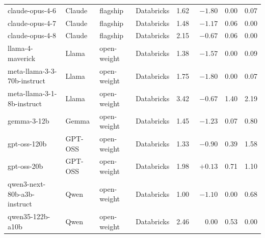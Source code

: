 \documentclass{article}
\begin{document}
\begin{table}[H]
\begin{tabular}{llllrrrr}
    claude-opus-4-6             & Claude  & flagship    & Databricks & 1.62 & $-1.80$ & 0.00 & 0.07 \\
    claude-opus-4-7             & Claude  & flagship    & Databricks & 1.48 & $-1.17$ & 0.06 & 0.00 \\
    claude-opus-4-8             & Claude  & flagship    & Databricks & 2.15 & $-0.67$ & 0.06 & 0.00 \\
    llama-4-maverick            & Llama   & open-weight & Databricks & 1.38 & $-1.57$ & 0.00 & 0.09 \\
    meta-llama-3-3-70b-instruct & Llama   & open-weight & Databricks & 1.75 & $-1.80$ & 0.00 & 0.07 \\
    meta-llama-3-1-8b-instruct  & Llama   & open-weight & Databricks & 3.42 & $-0.67$ & 1.40 & 2.19 \\
    gemma-3-12b                 & Gemma   & open-weight & Databricks & 1.45 & $-1.23$ & 0.07 & 0.80 \\
    gpt-oss-120b                & GPT-OSS & open-weight & Databricks & 1.33 & $-0.90$ & 0.39 & 1.58 \\
    gpt-oss-20b                 & GPT-OSS & open-weight & Databricks & 1.98 & $+0.13$ & 0.71 & 1.10 \\
    qwen3-next-80b-a3b-instruct & Qwen    & open-weight & Databricks & 1.00 & $-1.10$ & 0.00 & 0.68 \\
    qwen35-122b-a10b            & Qwen    & open-weight & Databricks & 2.46 & $\phantom{-}0.00$ & 0.53 & 0.00 \\
    \bottomrule
  \end{tabular}
\end{table}
\end{document}
